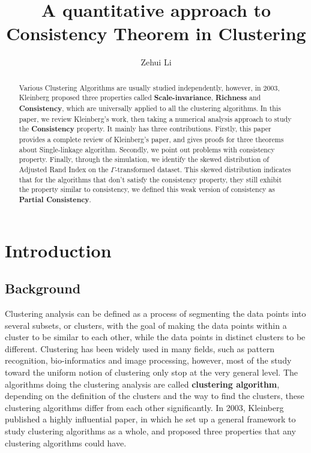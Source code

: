 \documentclass{uonmathreport}
\title{A quantitative approach to Consistency Theorem in Clustering}
\author{Zehui Li}
\begin{document}
\maketitle

\begin{abstract}
Various Clustering Algorithms are usually studied independently, however, in 2003, Kleinberg\cite{Kleinberg} proposed three properties called \textbf{Scale-invariance}, \textbf{Richness} and \textbf{Consistency}, which are universally applied to all the clustering algorithms. In this paper, we review Kleinberg's work, then taking a numerical analysis approach to study the \textbf{Consistency} property. It mainly has three contributions. Firstly, this paper provides a complete review of Kleinberg's paper, and gives proofs for three theorems about Single-linkage algorithm. Secondly, we point out problems with consistency property. Finally, through the simulation, we identify the skewed distribution of Adjusted Rand Index on the $\Gamma$-transformed dataset. This skewed distribution indicates that for the algorithms that don't satisfy the consistency property, they still exhibit the property similar to consistency, we defined this weak version of consistency as \textbf{Partial Consistency}.

\end{abstract}

\setcounter{tocdepth}{2}  %
\tableofcontents 
\newpage

\section{Introduction} \label{sec:intro}
\subsection{Background}
Clustering analysis can be defined as a process of segmenting the data points into several subsets, or clusters, with the goal of making the data points within a cluster to be similar to each other, while the data points in distinct clusters to be different. Clustering has been widely used in many fields, such as pattern recognition, bio-informatics and image processing, however, most of the study toward the uniform notion of clustering only stop at the very general level. The algorithms doing the clustering analysis are called \textbf{clustering algorithm}, depending on the definition of the clusters and the way to find the clusters, these clustering algorithms differ from each other significantly. In 2003, Kleinberg \cite{Kleinberg} published a highly influential paper, in which he set up a general framework to study clustering algorithms as a whole, and proposed three properties that any clustering algorithms could have.
\end{document}
